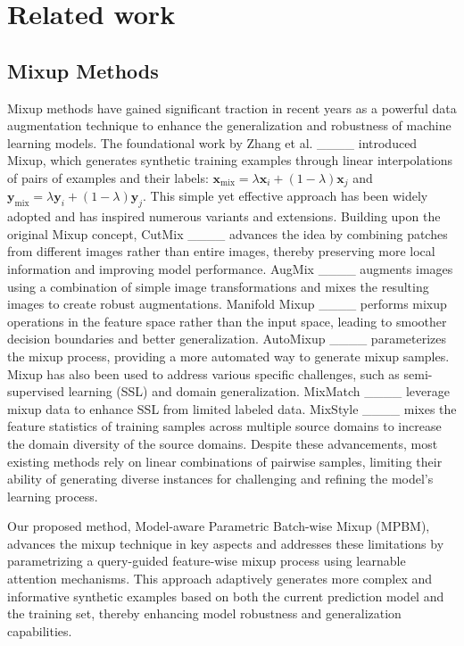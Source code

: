 \section{Related work}
\subsection{Mixup Methods}
Mixup methods have gained significant traction in recent years as a powerful data augmentation technique to enhance the generalization and robustness of machine learning models. The foundational work by Zhang et al. ____ introduced Mixup, which generates synthetic training examples through linear interpolations of pairs of examples and their labels: 
$\mathbf{x}_{\text{mix}}=\lambda \mathbf{x}_i + (1-\lambda)\mathbf{x}_j$ 
and $\mathbf{y}_{\text{mix}}=\lambda \mathbf{y}_i + (1-\lambda)\mathbf{y}_j$. 
This simple yet effective approach has been widely adopted and has inspired numerous variants and extensions.
Building upon the original Mixup concept, CutMix ____ advances the idea by combining patches from different images rather than entire images, thereby preserving more local information and improving model performance. 
AugMix ____ augments images using a combination of simple image transformations and mixes the resulting images to create robust augmentations. 
Manifold Mixup ____ performs mixup operations in the feature space rather than the input space, leading to smoother decision boundaries and better generalization.
AutoMixup ____ parameterizes the mixup process, 
providing a more automated way to generate mixup samples. 
Mixup has also been used to address various specific challenges, 
such as semi-supervised learning (SSL) and domain generalization. 
MixMatch ____ leverage mixup data 
to enhance SSL from limited labeled data. 
MixStyle ____ mixes the feature statistics of training samples across multiple source domains 
to increase the domain diversity of the source domains. 
Despite these advancements, most existing methods rely on linear combinations of pairwise samples, 
limiting their ability of 
generating diverse instances
for challenging and refining the model's learning process.

Our proposed method, Model-aware Parametric Batch-wise Mixup (MPBM), 
advances the mixup technique in key aspects and 
addresses these limitations by 
parametrizing a query-guided feature-wise mixup process 
using learnable attention mechanisms. 
This approach adaptively generates more complex and informative synthetic examples
based on both the current prediction model and the training set, 
thereby enhancing model robustness and generalization capabilities.

